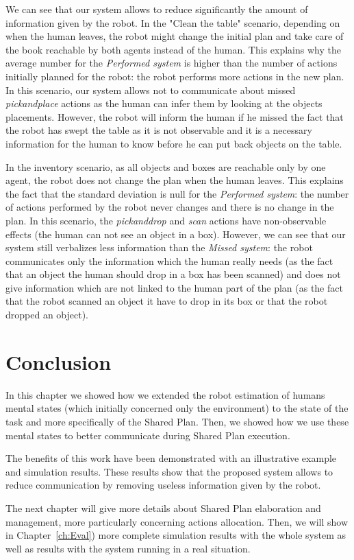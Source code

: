 \documentclass[english,a4paper,11pt,twoside]{StyleThese}
\begin{document}
We can see that our system allows to reduce significantly the amount of information given by the robot. In the "Clean the table" scenario, depending on when the human leaves, the robot might change the initial plan and take care of the book reachable by both agents instead of the human. This explains why the average number for the \textit{Performed system} is higher than the number of actions initially planned for the robot: the robot performs more actions in the new plan. In this scenario, our system allows not to communicate about missed \textit{pickandplace} actions as the human can infer them by looking at the objects placements. However, the robot will inform the human if he missed the fact that the robot has swept the table as it is not observable and it is a necessary information for the human to know before he can put back objects on the table.

In the inventory scenario, as all objects and boxes are reachable only by one agent, the robot does not change the plan when the human leaves. This explains the fact that the standard deviation is null for the \textit{Performed system}: the number of actions performed by the robot never changes and there is no change in the plan. In this scenario, the \textit{pickanddrop} and \textit{scan} actions have non-observable effects (the human can not see an object in a box). However, we can see that our system still verbalizes less information than the \textit{Missed system}: the robot communicates only the information which the human really needs (as the fact that an object the human should drop in a box has been scanned) and does not give information which are not linked to the human part of the plan (as the fact that the robot scanned an object it have to drop in its box or that the robot dropped an object).


\section{Conclusion}

In this chapter we showed how we extended the robot estimation of humans mental states (which initially concerned only the environment) to the state of the task and more specifically of the Shared Plan. Then, we showed how we use these mental states to better communicate during Shared Plan execution.

The benefits of this work have been demonstrated with an illustrative example and simulation results. These results show that the proposed system allows to reduce communication by removing useless information given by the robot.

The next chapter will give more details about Shared Plan elaboration and management, more particularly concerning actions allocation. Then, we will show in Chapter~\ref{ch:Eval}) more complete simulation results with the whole system as well as results with the system running in a real situation.

\ifdefined{}
\else


\end{document}
